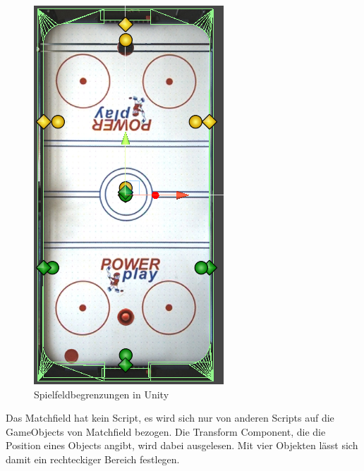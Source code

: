 \begin{figure} [h]
\begin{minipage}[t]{0.2\textwidth}
\includegraphics[width=\textwidth]{images/matchfield}
 \caption{Spielfeldbegrenzungen in Unity}
 \label{unity_matchfield}
\end{minipage}
\end{figure}
Das Matchfield hat kein Script, es wird sich nur von anderen Scripts auf die GameObjects von Matchfield bezogen. Die Transform Component, die die Position eines Objects angibt, wird dabei ausgelesen. Mit vier Objekten lässt sich damit ein rechteckiger Bereich festlegen. \\

